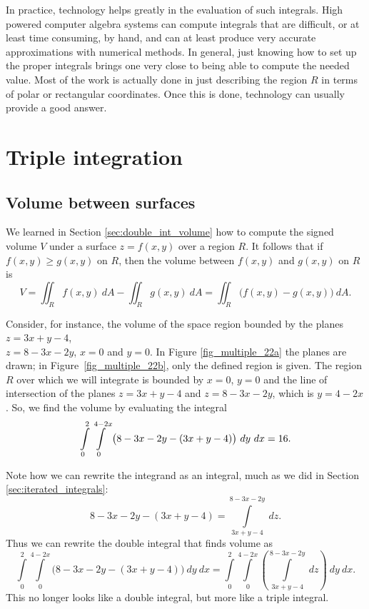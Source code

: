 In practice, technology helps greatly in the evaluation of such integrals. High powered computer algebra systems can compute integrals that are difficult, or at least time consuming, by hand, and can at least produce very accurate approximations with numerical methods. In general, just knowing how to set up the proper integrals brings one very close to being able to compute the needed value. Most of the work is actually done in just describing the region $R$ in terms of polar or rectangular coordinates. Once this is done, technology can usually provide a good answer.


\section{Triple integration}\label{sec:triple_int}

\subsection{Volume between surfaces}
We learned in Section \ref{sec:double_int_volume} how to compute the signed volume $V$ under a surface $z=f(x,y)$ over a region $R$. It follows that if $f(x,y)\geq g(x,y)$ on $R$, then the volume between $f(x,y)$ and $g(x,y)$ on $R$ is 
$$V = \iint_R f(x,y)\ dA - \iint_R g(x,y)\ dA = \iint_R \big(f(x,y)-g(x,y)\big)\ dA.$$


Consider, for instance, the volume of the space region bounded by the planes $z=3x+y-4$, \\ $z=8-3x-2y$, $x=0$ and $y=0$. In Figure \ref{fig_multiple_22a} the planes are drawn; in Figure~\ref{fig_multiple_22b}, only the defined region is given. The region $R$ over which we will integrate is bounded by $x=0$, $y=0$ and the line of intersection of the planes  $z=3x+y-4$ and $z=8-3x-2y$, which is $y=4-2x$. So, we find  the volume by evaluating the integral 
$$\displaystyle \int\limits_0^2\int\limits_0^{4-2x} \big(8-3x-2y-(3x+y-4)\big)\ dy\ dx=16.$$



Note how we can rewrite the integrand as an integral, much as we did in Section \ref{sec:iterated_integrals}:
$$8-3x-2y-(3x+y-4) = \int\limits_{3x+y-4}^{8-3x-2y}\ dz.$$
Thus we can rewrite the double integral that finds volume as
$$\int\limits_0^2\int\limits_0^{4-2x} \big(8-3x-2y-(3x+y-4)\big)\ dy\ dx = \int\limits_0^2\int\limits_0^{4-2x}\left(\int\limits_{3x+y-4}^{8-3x-2y}\ dz\right)\ dy\ dx.$$
This no longer looks like a double integral, but more like a triple integral.


